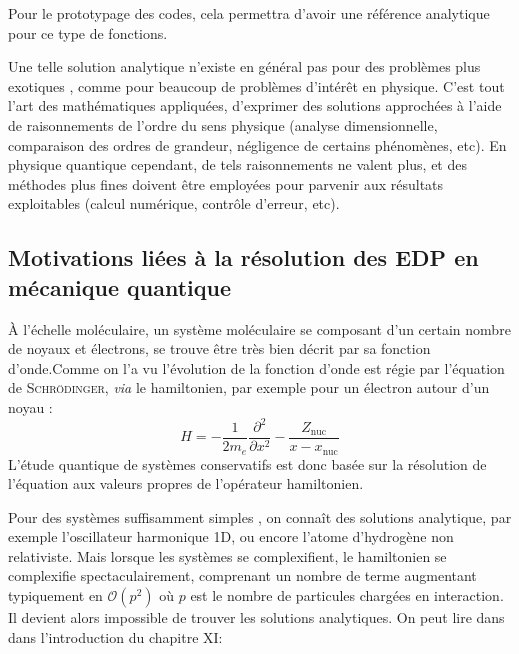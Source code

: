 \documentclass[svgnames,dvipsnames,a4paper,10pt,french]{report}
\begin{document}
Pour le prototypage des codes, cela permettra d'avoir une référence analytique pour ce type de fonctions.


Une telle solution analytique n'existe en général pas pour des problèmes plus \og exotiques \fg{}, comme pour beaucoup de problèmes d'intérêt en physique. C'est tout l'art des mathématiques appliquées, d'exprimer des solutions approchées à l'aide de raisonnements de l'ordre du sens physique (analyse dimensionnelle, comparaison des ordres de grandeur, négligence de certains phénomènes, etc). En physique quantique cependant, de tels raisonnements ne valent plus, et des méthodes plus fines doivent être employées pour parvenir aux résultats exploitables (calcul numérique, contrôle d'erreur, etc).


\subsection{Motivations liées à la résolution des EDP en mécanique quantique}

À l'échelle moléculaire, un système moléculaire se composant d'un certain nombre de noyaux et électrons, se trouve être très bien décrit par sa fonction d'onde.Comme on l'a vu l'évolution de la fonction d'onde est régie par l'équation de \textsc{Schrödinger},  \emph{via} le  hamiltonien, par exemple pour un électron autour d'un noyau :
\begin{equation*}
    H = -\frac{1}{2m_e} \frac{\partial^2}{\partial x^2} - \frac{Z_{\text{nuc}}}{x-x_{\text{nuc}}}
\end{equation*}
 L'étude quantique de systèmes conservatifs est donc basée sur la résolution de l'équation aux valeurs propres de l'opérateur hamiltonien. 

 Pour des systèmes \og suffisamment simples \fg{}, on connaît des solutions analytique, par exemple l'oscillateur harmonique 1D, ou encore l'atome d'hydrogène non relativiste. Mais lorsque les systèmes se complexifient, le hamiltonien se complexifie spectaculairement, comprenant un nombre de terme augmentant typiquement en $\mathcal{O}(p^2)$ où $p$ est le nombre de particules chargées en interaction. Il devient alors impossible de trouver les solutions analytiques. On peut lire dans \cite{cohen-tannoudji_mecanique_2021-1} dans l'introduction du chapitre XI:
\end{document}
